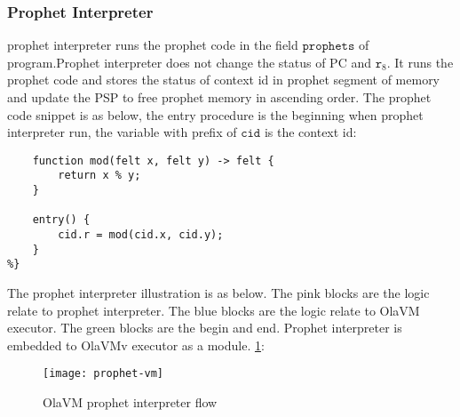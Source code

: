 \subsubsection{Prophet Interpreter}\label{subsec: prophet-interpreter}
prophet interpreter runs the prophet code in the field $\texttt{prophets}$ of program.Prophet interpreter does not change the status of PC and $\texttt{r}_{8}$.
It runs the prophet code and stores the status of context id in prophet segment of memory and update the PSP to free prophet memory in ascending order.
The prophet code snippet is as below, the entry procedure is the beginning when prophet interpreter run, the variable with prefix of $\texttt{cid}$ is the context id:
\begin{lstlisting}[label={lst:prophet-demo}]
%{
    function mod(felt x, felt y) -> felt {
        return x % y;
    }

    entry() {
        cid.r = mod(cid.x, cid.y);
    }
%}
\end{lstlisting}

The prophet interpreter illustration is as below.
The pink blocks are the logic relate to prophet interpreter.
The blue blocks are the logic relate to OlaVM executor.
The green blocks are the begin and end.
Prophet interpreter is embedded to OlaVMv executor as a module. \ref{fig: prophet-interpreter-logic}:
\begin{figure}[!htp]
    \centering
    \texttt{[image: prophet-vm]}
    \caption{OlaVM prophet interpreter flow}
    \label{fig: prophet-interpreter-logic}
\end{figure}

